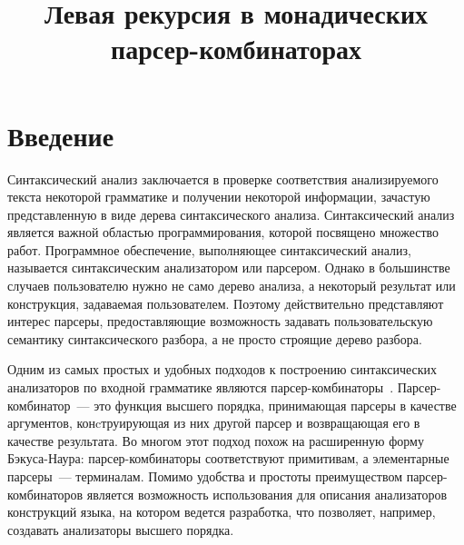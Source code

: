 \documentclass[conference]{IEEEtran}
\begin{document}
\title{Левая рекурсия в монадических парсер-комбинаторах}

\author{
}

\maketitle

\begin{abstract}



\end{abstract}

\begin{IEEEkeywords}
\end{IEEEkeywords}

\section{Введение}

Синтаксический анализ заключается в проверке соответствия анализируемого текста некоторой грамматике и получении некоторой информации, зачастую представленную в виде дерева синтаксического анализа. Синтаксический анализ является важной областью программирования, которой посвящено множество работ. Программное обеспечение, выполняющее синтаксический анализ, называется синтаксическим анализатором или парсером. Однако в большинстве случаев пользователю нужно не само дерево анализа, а некоторый результат или конструкция, задаваемая пользователем. Поэтому действительно представляют интерес парсеры, предоставляющие возможность задавать пользовательскую семантику синтаксического разбора, а не просто строящие дерево разбора.

Одним из самых простых и удобных подходов к построению синтаксических анализаторов по входной грамматике являются парсер-комбинаторы~\cite{meijer}. Парсер-комбинатор~--- это функция высшего порядка, принимающая парсеры в качестве аргументов, конcтруирующая из них другой парсер и возвращающая его в качестве результата. Во многом этот подход похож на расширенную форму Бэкуса-Наура: парсер-комбинаторы соответствуют примитивам, а элементарные парсеры~--- терминалам. Помимо удобства и простоты преимуществом парсер-комбинаторов является возможность использования для описания анализаторов конструкций языка, на котором ведется разработка, что позволяет, например, создавать анализаторы высшего порядка.
\end{document}
